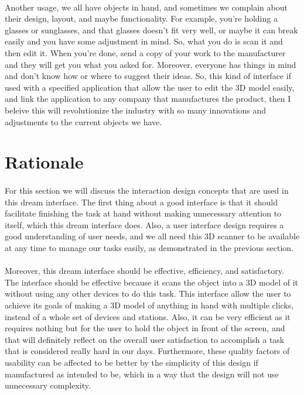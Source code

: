 \documentclass[12pt, oneside]{article}   	%
\begin{document}
\paragraph{}
Another usage, we all have objects in hand, and sometimes we complain about their design, layout, and maybe functionality. For example, you're holding a glasses or sunglasses, and that glasses doesn't fit very well, or maybe it can break easily and you have some adjustment in mind. So, what you do is scan it and then edit it.  When you're done, send a copy of your work to the manufacturer and they will get you what you asked for.  Moreover, everyone has things in mind and don't know how or where to suggest their ideas.  So, this kind of interface if used with a specified application that allow the user to edit the 3D model easily, and link the application to any company that manufactures the product, then I beleive this will revolutionize the industry with so many innovations and adjustments to the current objects we have.  

\section{Rationale}
\paragraph{}
For this section we will discuss the interaction design concepts that are used in this dream interface. The first thing about a good interface is that it should facilitate finishing the task at hand without making unnecessary attention to itself, which this dream interface does. Also, a user interface design requires a good understanding of user needs, and we all need this 3D scanner to be available at any time to manage our tasks easily, as demonstrated in the previous section. 
\paragraph{}
Moreover, this dream interface should be effective, efficiency, and satisfactory.  The interface should be effective because it scans the object into a 3D model of it without using any other devices to do this task. This interface allow the user to achieve its goals of making a 3D model of anything in hand with multiple clicks, instead of a whole set of devices and stations.  Also, it can be very efficient as it requires nothing but for the user to hold the object in front of the screen, and that will definitely reflect on the overall user satisfaction to accomplish a task that is considered really hard in our days.  Furthermore, these quality factors of usability can be affected to be better by the simplicity of this design if manufactured as intended to be, which in a way that the design will not use unnecessary complexity. 
\end{document}
